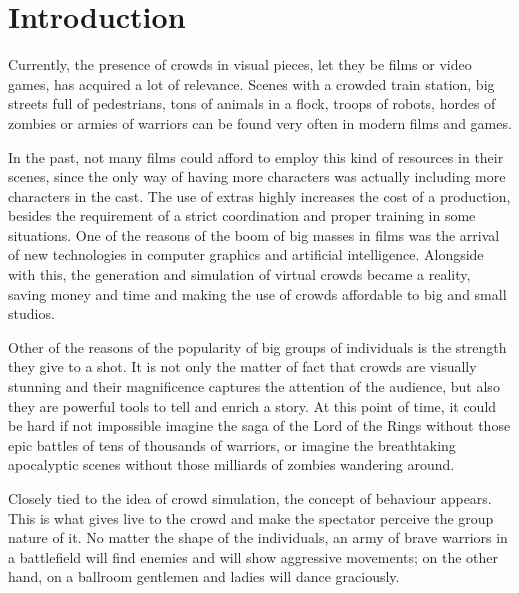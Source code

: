 
\ifx\isEmbedded\undefined

\graphicspath{{../img/}}

\fi

\chapter{Introduction}
\label{chap:intro}

Currently, the presence of crowds in visual pieces, let they be films or video games, has acquired a lot of relevance. Scenes with a crowded train station, big streets full of pedestrians, tons of animals in a flock, troops of robots, hordes of zombies or armies of warriors can be found very often in modern films and games.

In the past, not many films could afford to employ this kind of resources in their scenes, since the only way of having more characters was actually including more characters in the cast. The use of extras highly increases the cost of a production, besides the requirement of a strict coordination and proper training in some situations. One of the reasons of the boom of big masses in films was the arrival of new technologies in computer graphics and artificial intelligence. Alongside with this, the generation and simulation of virtual crowds became a reality, saving money and time and making the use of crowds affordable to big and small studios.

Other of the reasons of the popularity of big groups of individuals is the strength they give to a shot. It is not only the matter of fact that crowds are visually stunning and their magnificence captures the attention of the audience, but also they are powerful tools to tell and enrich a story. At this point of time, it could be hard if not impossible imagine the saga of the Lord of the Rings without those epic battles of tens of thousands of warriors, or imagine the breathtaking apocalyptic scenes without those milliards of zombies wandering around.

Closely tied to the idea of crowd simulation, the concept of behaviour appears. This is what gives live to the crowd and make the spectator perceive the group nature of it. No matter the shape of the individuals, an army of brave warriors in a battlefield will find enemies and will show aggressive movements; on the other hand, on a ballroom gentlemen and ladies will dance graciously.

